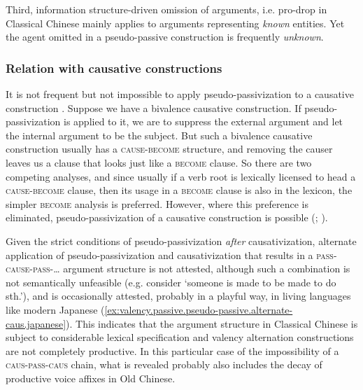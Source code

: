\documentclass[UTF8, a4paper, oneside, scheme=plain, 12pt]{ctexrep}
\newcommand*{\citepage}[1]{p.~{#1}}
\newcommand*{\citepages}[1]{pp.~{#1}}
\newcommand{\translate}[1]{`#1'}
\newcommand*{\category}[1]{\textsc{#1}}
\begin{document}
Third, information structure-driven omission of arguments, i.e. pro-drop in Classical Chinese mainly applies to arguments representing \emph{known} entities.
Yet the agent omitted in a pseudo-passive construction is frequently \emph{unknown}.

\subsubsection{Relation with causative constructions}\label{sec:grammatical.clause.verbal.argument-structure.pseudo-passive.causative-relation}

It is not frequent but not impossible to apply pseudo-passivization to a causative construction
\citep[\citepage{283}]{meiguang2018}.
Suppose we have a bivalence causative construction.
If pseudo-passivization is applied to it,
we are to suppress the external argument and let the internal argument to be the subject.
But such a bivalence causative construction usually has a \category{cause}-\category{become} structure,
and removing the causer leaves us a clause that looks just like a \category{become} clause.
So there are two competing analyses,
and since usually if a verb root is lexically licensed to head a \category{cause}-\category{become} clause,
then its usage in a \category{become} clause is also in the lexicon,
the simpler \category{become} analysis is preferred.
However, where this preference is eliminated, pseudo-passivization of a causative construction is possible 
(\citealt[\citepages{284,370-372}]{meiguang2018}; ).

Given the strict conditions of pseudo-passivization \emph{after} causativization,
alternate application of pseudo-passivization and causativization
that results in a \category{pass}-\category{cause}-\category{pass}-\dots{} argument structure is not attested,
although such a combination is not semantically unfeasible (e.g. consider \translate{someone is made to be made to do sth.}),
and is occasionally attested, probably in a playful way, in living languages like modern Japanese
(\ref{ex:valency.passive.pseudo-passive.alternate-caus.japanese}).
This indicates that the argument structure in Classical Chinese is subject to
considerable lexical specification and valency alternation constructions are not completely productive.
In this particular case of the impossibility of a \category{caus}-\category{pass}-\category{caus} chain,
what is revealed probably also includes the decay of productive voice affixes in Old Chinese.
\end{document}
